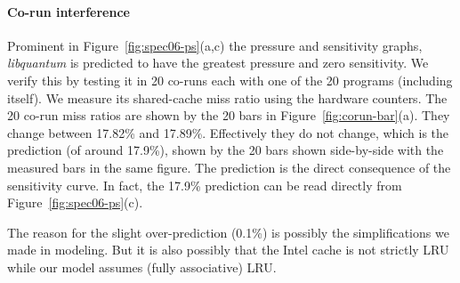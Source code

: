 \paragraph{Co-run interference}

Prominent in Figure~\ref{fig:spec06-ps}(a,c) the pressure and sensitivity
graphs, \emph{libquantum} is predicted to have the greatest pressure
and zero sensitivity.  We verify this by testing it in 20 co-runs each
with one of the 20 programs (including itself).  We measure its
shared-cache miss ratio using the hardware counters.  The 20 co-run
miss ratios are shown by the 20 bars in Figure~\ref{fig:corun-bar}(a).
They change between 17.82\% and 17.89\%.  Effectively they do not
change, which is the prediction (of around 17.9\%), shown by the 20 bars shown
side-by-side with the measured bars in the same figure.  The
prediction is the direct consequence of the sensitivity curve.  In
fact, the 17.9\% prediction can be read directly from
Figure~\ref{fig:spec06-ps}(c).

The reason for the slight over-prediction (0.1\%) is possibly the
simplifications we made in modeling.  But it is also possibly that the
Intel cache is not strictly LRU while our model assumes (fully
associative) LRU.

